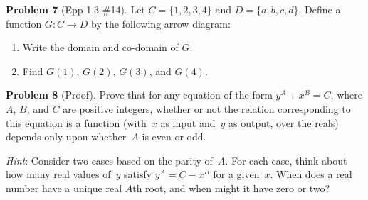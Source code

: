 \documentclass[11pt]{article}
\begin{document}
\bigskip

\noindent\textbf{Problem 7} (Epp 1.3 \#14). \;
Let $C = \{1, 2, 3, 4\}$ and $D = \{a, b, c, d\}$.  Define a function
$G\colon C \to D$ by the following arrow diagram:

\begin{center}
\end{center}

\begin{enumerate}[label=\textbf{\alph*.},itemsep=4pt]
  \item Write the domain and co-domain of $G$.
  \item Find $G(1)$, $G(2)$, $G(3)$, and $G(4)$.
\end{enumerate}

\bigskip

\noindent\textbf{Problem 8} (Proof). \;
Prove that for any equation of the form $y^A + x^B = C$, where
$A$, $B$, and $C$ are positive integers, whether or not the
relation corresponding to this equation is a function (with~$x$
as input and~$y$ as output, over the reals) depends only upon
whether~$A$ is even or odd.

\medskip\noindent
\emph{Hint}: Consider two cases based on the parity of~$A$.
For each case, think about how many real values of~$y$ satisfy
$y^A = C - x^B$ for a given~$x$.  When does a real number have a
unique real $A$th root, and when might it have zero or two?
\end{document}
